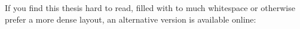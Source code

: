 

\begin{acknowledgements}      %

If you find this thesis hard to read, filled with to much whitespace or
otherwise prefer a more dense layout, an alternative version is available 
online:

\end{acknowledgements}



